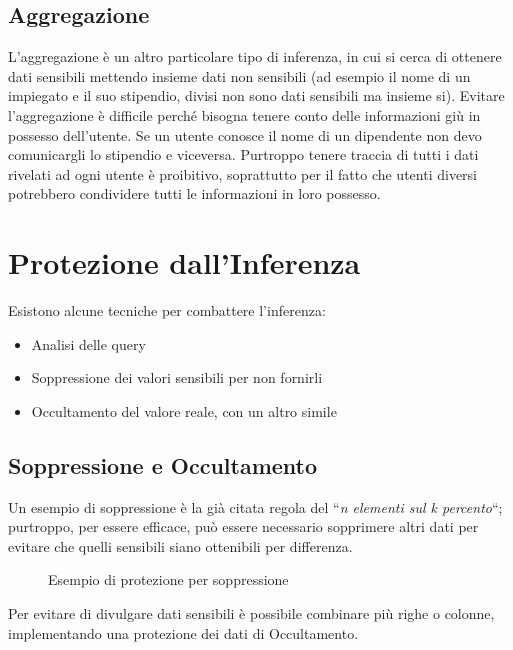 \subsection{Aggregazione}
L'aggregazione è un altro particolare tipo di inferenza, in cui si cerca di ottenere dati sensibili mettendo insieme dati non sensibili (ad esempio il nome di un impiegato e il suo stipendio, divisi non sono dati sensibili ma insieme si). 
\newline
Evitare l'aggregazione è difficile perché bisogna tenere conto delle informazioni giù in possesso dell'utente. Se un utente conosce il nome di un dipendente non devo comunicargli lo stipendio e viceversa. Purtroppo tenere traccia di tutti i dati rivelati ad ogni utente è proibitivo, soprattutto per il fatto che utenti diversi potrebbero condividere tutti le informazioni in loro possesso.

\section{Protezione dall'Inferenza}
Esistono alcune tecniche per combattere l'inferenza: 
\begin{itemize}
\item Analisi delle query
\item Soppressione dei valori sensibili per non fornirli
\item Occultamento del valore reale, con un altro simile
\end{itemize}

\subsection{Soppressione e Occultamento}
Un esempio di soppressione è la già citata regola del ``\textit{n elementi sul k percento}``; purtroppo, per essere efficace, può essere necessario sopprimere altri dati per evitare che quelli sensibili siano ottenibili per differenza.

\begin{figure}[htpb]
	\centering
		
				
		\caption{Esempio di protezione per soppressione
		  \label{fig:query_soppressione}}  

\end{figure}
Per evitare di divulgare dati sensibili è possibile combinare più righe o colonne, implementando una protezione dei dati di Occultamento.

